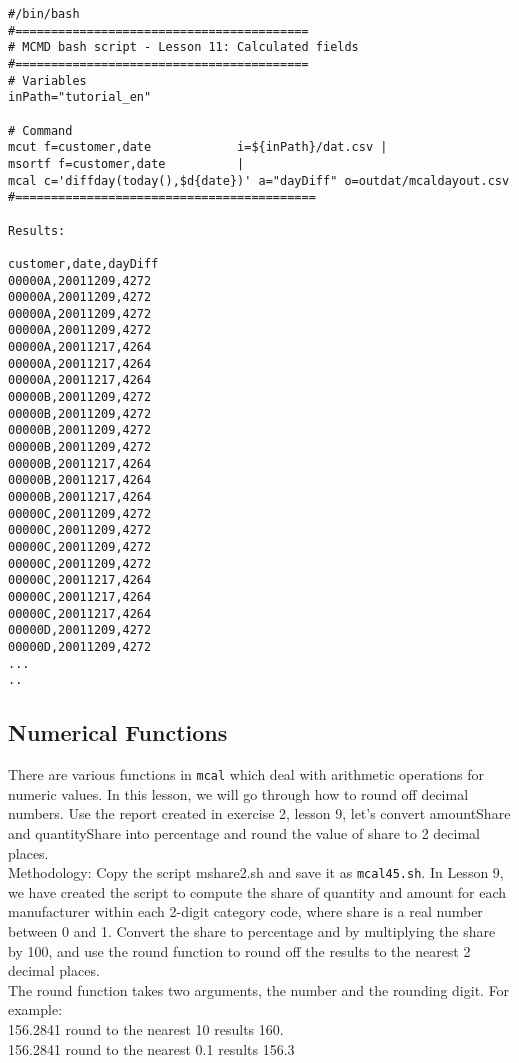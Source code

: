 \begin{verbatim}
#/bin/bash
#=========================================
# MCMD bash script - Lesson 11: Calculated fields
#=========================================
# Variables
inPath="tutorial_en"

# Command 
mcut f=customer,date            i=${inPath}/dat.csv |
msortf f=customer,date          |
mcal c='diffday(today(),$d{date})' a="dayDiff" o=outdat/mcaldayout.csv
#==========================================

Results: 

customer,date,dayDiff
00000A,20011209,4272
00000A,20011209,4272
00000A,20011209,4272
00000A,20011209,4272
00000A,20011217,4264
00000A,20011217,4264
00000A,20011217,4264
00000B,20011209,4272
00000B,20011209,4272
00000B,20011209,4272
00000B,20011209,4272
00000B,20011217,4264
00000B,20011217,4264
00000B,20011217,4264
00000C,20011209,4272
00000C,20011209,4272
00000C,20011209,4272
00000C,20011209,4272
00000C,20011217,4264
00000C,20011217,4264
00000C,20011217,4264
00000D,20011209,4272
00000D,20011209,4272
...
..
\end{verbatim}

\subsection{Numerical Functions }
There are various functions in \verb|mcal| which deal with arithmetic operations for numeric values. In this lesson, we will go through how to round off decimal numbers. Use the report created in exercise 2, lesson 9, let's convert amountShare and quantityShare into percentage and round the value of share to 2 decimal places.  \\

Methodology: Copy the script mshare2.sh and save it as \verb|mcal45.sh|. In Lesson 9, we have created the script to compute the share of quantity and amount for each manufacturer within each 2-digit category code, where share is a real number between 0 and 1. Convert the share to percentage and by multiplying the share by 100, and use the round function to round off the results to the nearest 2 decimal places. \\

The round function takes two arguments, the number and the rounding digit. For example: \\
156.2841 round to the nearest 10 results 160. \\
156.2841 round to the nearest 0.1 results 156.3 \\

